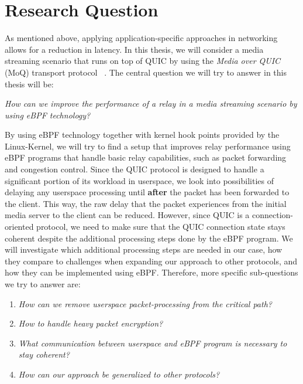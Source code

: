 \section{Research Question}\label{sec:research_question}

As mentioned above, applying application-specific approaches in networking allows for a reduction in latency.
In this thesis, we will consider a media streaming scenario that runs on top of QUIC by using the \textit{Media over QUIC} (MoQ) transport protocol
~\parencite{draft-moqtransport}.
The central question we will try to answer in this thesis will be:
\vspace{0.5cm}
\begin{center}
    \textit{How can we improve the performance of a relay in a media streaming scenario by using eBPF technology?}
\end{center}
\vspace{0.5cm}
By using eBPF technology together with kernel hook points provided by the Linux-Kernel, we will try to find a setup that improves relay 
performance using eBPF programs that handle basic relay capabilities, such as packet forwarding and congestion control.
Since the QUIC protocol is designed to handle a significant portion of its workload in userspace, we look into possibilities of delaying any 
userspace processing until \textbf{after} the packet has been forwarded to the client.
This way, the raw delay that the packet experiences from the initial media server to the client can be reduced. 
However, since QUIC is a connection-oriented protocol, we need to make sure that the QUIC connection state stays 
coherent despite the additional processing steps done by the eBPF program.
We will investigate which additional processing steps are needed in our case, how they compare to challenges when expanding our approach to other protocols, 
and how they can be implemented using eBPF\@.
Therefore, more specific sub-questions we try to answer are:
\vspace{0.5cm}
\begin{enumerate}
    \item \textit{How can we remove userspace packet-processing from the critical path?}
    \item \textit{How to handle heavy packet encryption?}
    \item \textit{What communication between userspace and eBPF program is necessary to stay coherent?}
    \item \textit{How can our approach be generalized to other protocols?}
\end{enumerate}
\vspace{0.5cm}